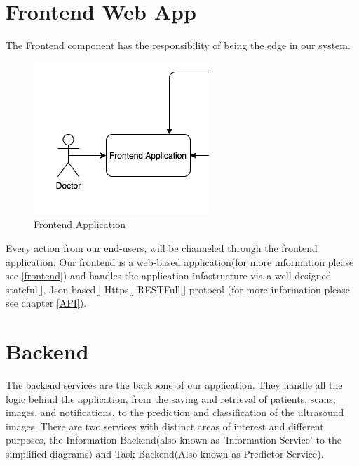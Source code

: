 	\section{Frontend Web App}
		The Frontend component has the responsibility of being the edge in our system.
		\begin{figure}[H]
			\iftrue
			\caption{Frontend Application}
			\centering
			\includegraphics[scale=0.5]{figures/frontend}
			\fi
		\end{figure}
		Every action from our end-users, will be channeled through the frontend application. Our frontend is a web-based application(for 
		more information please see \ref{frontend}) and handles the application infastructure via a well designed stateful[\cite{session-rfc6265}],
		Json-based[\cite{json-rfc7159}] Https[\cite{rfc2818}] RESTFull[\cite{restful-rfc7231}]
		protocol (for more information please see chapter \ref{API}).
	\section{Backend}
		The backend services are the backbone of our application. They handle all the logic behind the application, from the saving 
		and retrieval of patients, scans, images, and notifications, to the prediction and classification of the ultrasound images. 
		There are two services with distinct areas of interest and different purposes, the Information Backend(also known as 
		'Information Service' to the simplified diagrams) and Task Backend(Also known as Predictor Service).
